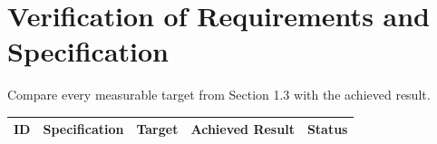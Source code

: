 \section{Verification of Requirements and Specification}
Compare every measurable target from Section 1.3 with the achieved result.

\begin{center}
    \begin{tabular}{| c | c | c | c | c | }
        \hline
        ID & Specification & Target & Achieved Result & Status \\
        \hline
    \end{tabular}
\end{center}